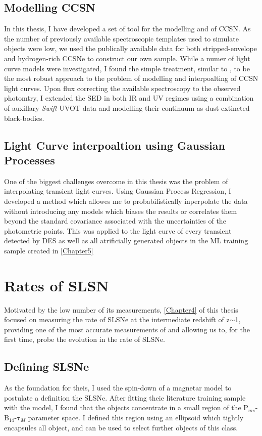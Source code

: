 \subsection{Modelling CCSN}
In this thesis, I have developed a set of tool for the modelling and of CCSN. As the number of previously available spectroscopic templates used to simulate objects were low, we used the publically available data for both stripped-envelope and hydrogen-rich CCSNe to construct our own sample. While a numer of light curve models were investigated, I found the simple treatment, similar to \citet{Bazin2009}, to be the most robust approach to the problem of modelling and interpoalting of CCSN light curves. Upon flux correcting the available spectroscopy to the observed photomtry, I extended the SED in both IR and UV regimes using a combination of auxillary \textit{Swift}-UVOT data and modelling their continuum as dust extincted black-bodies.

\subsection{Light Curve interpoaltion using Gaussian Processes}
One of the biggest challenges overcome in this thesis was the problem of interpolating transient light curves. Using Gaussian Process Regression, I developed a method which allowes me to probabilistically inperpolate the data without introducing any models which biases the results or correlates them beyond the standard covariance associated with the uncertainties of the photometric points. This was applied to the light curve of every transient detected by DES as well as all atrificially generated objects in the ML training sample created in \cref{Chapter5}

\section{Rates of SLSN}
Motivated by the low number of its measurements, \cref{Chapter4} of this thesis focused on measuring the rate of SLSNe at the intermediate redshift of z$\sim$1, providing one of the most accurate measurements of and allowing us to, for the first time, probe the evolution in the rate of SLSNe.

\subsection{Defining SLSNe}
As the foundation for theis, I used the spin-down of a magnetar model to postulate a definition the SLSNe. After fitting theie literature training sample with the model, I found that the objects concentrate in a small region of the P$_{ms}$-B$_{14}$-$\mathrm{\tau}_M$ parameter space. I defined this region using an ellipsoid which tightly encapsules all object, and can be used to select further objects of this class.

